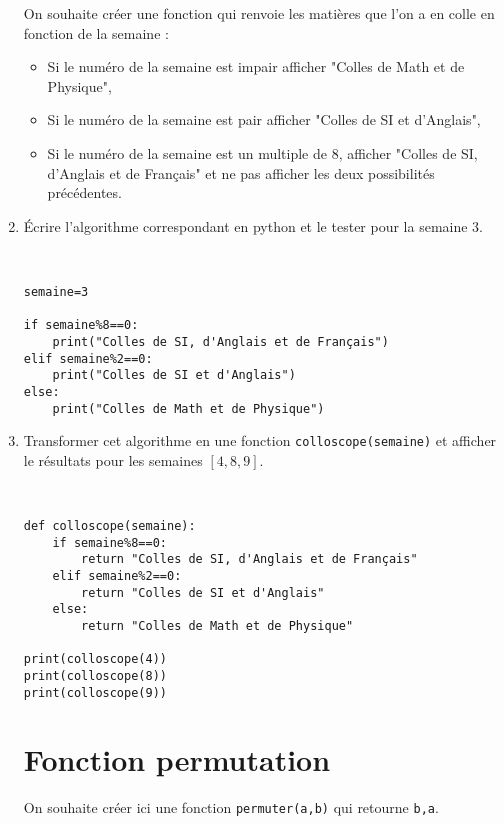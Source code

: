\begin{enumerate}
On souhaite créer une fonction qui renvoie les matières que l'on a en colle en fonction de la semaine :
\begin{itemize}
\item Si le numéro de la semaine est impair afficher "Colles de Math et de Physique",
\item Si le numéro de la semaine est pair afficher "Colles de SI et d'Anglais",
\item Si le numéro de la semaine est un multiple de 8, afficher "Colles de SI, d'Anglais et de Français" et ne pas afficher les deux possibilités précédentes.
\end{itemize}

 \item Écrire l'algorithme correspondant en python et le tester pour la semaine 3. 

\begin{solution}~\ \\
\begin{verbatim}
semaine=3

if semaine%8==0:
    print("Colles de SI, d'Anglais et de Français")
elif semaine%2==0:
    print("Colles de SI et d'Anglais")
else:
    print("Colles de Math et de Physique")
\end{verbatim}
\end{solution}

 \item Transformer cet algorithme en une fonction \verb?colloscope(semaine)? et afficher le résultats pour les semaines $\left[4,8,9\right]$.

\begin{solution}~\ \\
\begin{verbatim}
def colloscope(semaine):
    if semaine%8==0:
        return "Colles de SI, d'Anglais et de Français"
    elif semaine%2==0:
        return "Colles de SI et d'Anglais"
    else:
        return "Colles de Math et de Physique"

print(colloscope(4))
print(colloscope(8))
print(colloscope(9))
\end{verbatim}
\end{solution}

\section*{Fonction permutation}

On souhaite créer ici une fonction \verb?permuter(a,b)? qui retourne \verb?b,a?.


\end{enumerate}
